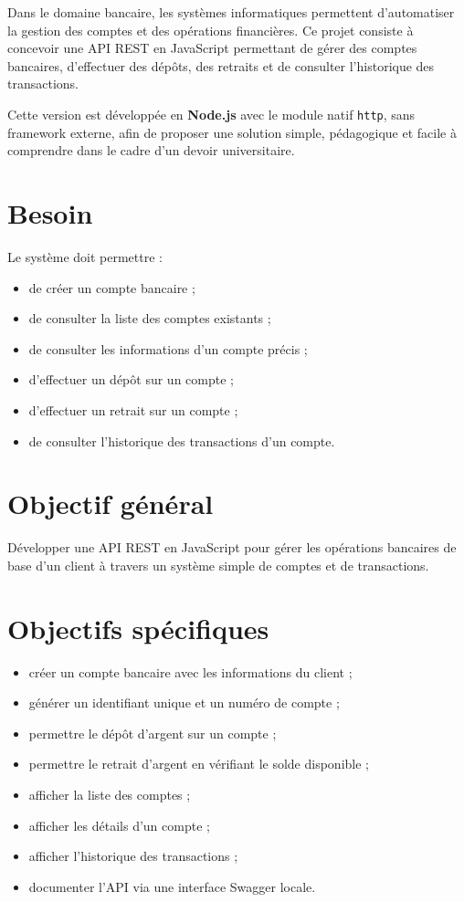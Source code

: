 \documentclass[12pt,a4paper]{article}
\begin{document}
Dans le domaine bancaire, les systèmes informatiques permettent d'automatiser la gestion des comptes et des opérations financières. Ce projet consiste à concevoir une API REST en JavaScript permettant de gérer des comptes bancaires, d'effectuer des dépôts, des retraits et de consulter l'historique des transactions.

Cette version est développée en \textbf{Node.js} avec le module natif \texttt{http}, sans framework externe, afin de proposer une solution simple, pédagogique et facile à comprendre dans le cadre d'un devoir universitaire.

\section{Besoin}

Le système doit permettre :

\begin{itemize}
    \item de créer un compte bancaire ;
    \item de consulter la liste des comptes existants ;
    \item de consulter les informations d'un compte précis ;
    \item d'effectuer un dépôt sur un compte ;
    \item d'effectuer un retrait sur un compte ;
    \item de consulter l'historique des transactions d'un compte.
\end{itemize}

\section{Objectif général}

Développer une API REST en JavaScript pour gérer les opérations bancaires de base d'un client à travers un système simple de comptes et de transactions.

\section{Objectifs spécifiques}

\begin{itemize}
    \item créer un compte bancaire avec les informations du client ;
    \item générer un identifiant unique et un numéro de compte ;
    \item permettre le dépôt d'argent sur un compte ;
    \item permettre le retrait d'argent en vérifiant le solde disponible ;
    \item afficher la liste des comptes ;
    \item afficher les détails d'un compte ;
    \item afficher l'historique des transactions ;
    \item documenter l'API via une interface Swagger locale.
\end{itemize}
\end{document}
